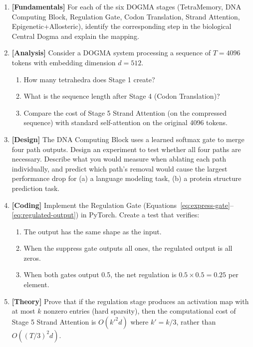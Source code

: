 \begin{enumerate}[label=\textbf{7.\arabic*.}, leftmargin=2.5em]

\item \textbf{[Fundamentals]} For each of the six DOGMA stages (TetraMemory, DNA Computing Block, Regulation Gate, Codon Translation, Strand Attention, Epigenetic+Allosteric), identify the corresponding step in the biological Central Dogma and explain the mapping.

\item \textbf{[Analysis]} Consider a DOGMA system processing a sequence of $T = 4096$ tokens with embedding dimension $d = 512$.
\begin{enumerate}[label=(\alph*)]
  \item How many tetrahedra does Stage 1 create?
  \item What is the sequence length after Stage 4 (Codon Translation)?
  \item Compare the cost of Stage 5 Strand Attention (on the compressed sequence) with standard self-attention on the original 4096 tokens.
\end{enumerate}

\item \textbf{[Design]} The DNA Computing Block uses a learned softmax gate to merge four path outputs. Design an experiment to test whether all four paths are necessary. Describe what you would measure when ablating each path individually, and predict which path's removal would cause the largest performance drop for (a) a language modeling task, (b) a protein structure prediction task.

\item \textbf{[Coding]} Implement the Regulation Gate (Equations~\ref{eq:express-gate}--\ref{eq:regulated-output}) in PyTorch. Create a test that verifies:
\begin{enumerate}[label=(\alph*)]
  \item The output has the same shape as the input.
  \item When the suppress gate outputs all ones, the regulated output is all zeros.
  \item When both gates output 0.5, the net regulation is $0.5 \times 0.5 = 0.25$ per element.
\end{enumerate}

\item \textbf{[Theory]} Prove that if the regulation stage produces an activation map with at most $k$ nonzero entries (hard sparsity), then the computational cost of Stage 5 Strand Attention is $O(k'^2 d)$ where $k' = k/3$, rather than $O((T/3)^2 d)$.


\end{enumerate}
